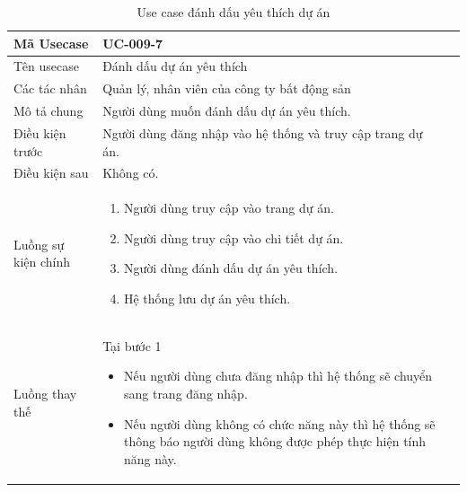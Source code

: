 \documentclass[12pt,a4paper]{article}
\begin{document}
    \begin{table}[H]
        \centering
        \begin{tabular}{|p{3.5cm}|p{11.5cm}|c|}
            \hline
            Mã Usecase      & UC-009-7                                                   \\
            \hline
            Tên usecase     & Đánh dấu dự án yêu thích                                   \\
            \hline
            Các tác nhân    & Quản lý, nhân viên của công ty bất động sản                \\
            \hline
            Mô tả chung     & Người dùng muốn đánh dấu dự án yêu thích.                  \\
            \hline

            Điều kiện trước & Người dùng đăng nhập vào hệ thống và truy cập trang dự án. \\
            \hline

            Điều kiện sau   & Không có.                                                  \\
            \hline

            Luồng sự kiện chính & \vspace{-.8cm}\begin{enumerate}
                                                    \item Người dùng truy cập vào trang dự án.
                                                    \item Người dùng truy cập vào chi tiết dự án.
                                                    \item Người dùng đánh dấu dự án yêu thích.
                                                    \item Hệ thống lưu dự án yêu thích.
            \end{enumerate}
            \\
            \hline
            Luồng thay thế & Tại bước 1\newline
            \vspace{-.8cm}\begin{itemize}
                              \item Nếu người dùng chưa đăng nhập thì hệ thống sẽ chuyển sang trang đăng nhập.
                              \item Nếu người dùng không có chức năng này thì hệ thống sẽ thông báo người dùng không được phép thực hiện tính năng này.
            \end{itemize}
            \\ \hline
        \end{tabular}
        \caption{Use case đánh dấu yêu thích dự án}

    \end{table}
\end{document}
